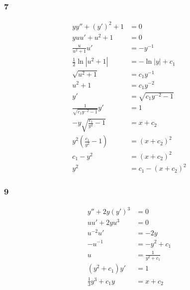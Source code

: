 \documentclass{article}
\begin{document}
\subsubsection{7}

\begin{align*}
  y y'' + (y')^2 + 1                     & = 0                     \\
  y u u' + u^2 + 1                       & = 0                     \\
  \frac{u}{u^2 + 1} u'                   & = -y^{-1}               \\
  \frac{1}{2} \ln |u^2 + 1|              & = -\ln |y| + c_1        \\
  \sqrt{u^2 + 1}                         & = c_1 y^{-1}            \\
  u^2 + 1                                & = c_1 y^{-2}            \\
  y'                                     & = \sqrt{c_1 y^{-2} - 1} \\
  \frac{1}{\sqrt{c_1 y^{-2} - 1}} y'     & = 1                     \\
  -y \sqrt{\frac{c_1}{y^2} - 1}          & = x + c_2               \\
  y^2 \left( \frac{c_1}{y^2} - 1 \right) & = (x + c_2)^2           \\
  c_1 - y^2                              & = (x + c_2)^2           \\
  y^2                                    & = c_1 - (x + c_2)^2
\end{align*}

\subsubsection{9}

\begin{align*}
  y'' + 2y (y')^3         & = 0                   \\
  u u' + 2yu^3            & = 0                   \\
  u^{-2} u'               & = -2y                 \\
  -u^{-1}                 & = -y^2 + c_1          \\
  u                       & = \frac{1}{y^2 + c_1} \\
  (y^2 + c_1) y'          & = 1                   \\
  \frac{1}{3} y^3 + c_1 y & = x + c_2
\end{align*}
\end{document}
